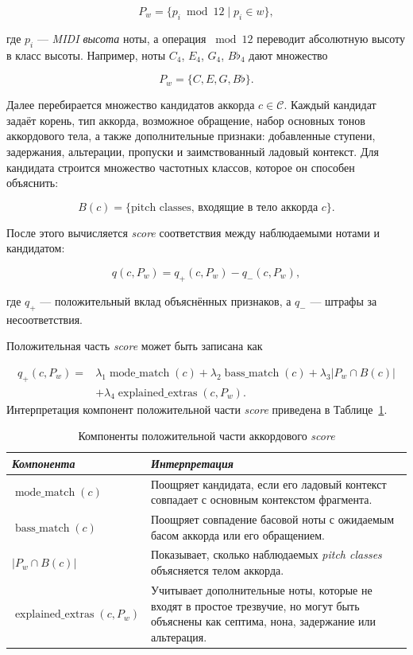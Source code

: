 \documentclass[a4paper,12pt]{extarticle}
\begin{document}
\[
P_w = \{p_i \bmod 12 \mid p_i \in w\},
\]

где $p_i$ --- \textit{MIDI высота} ноты, а операция $\bmod 12$ переводит абсолютную высоту в класс высоты. Например, ноты $C_4$, $E_4$, $G_4$, $B\flat_4$ дают множество

\[
P_w = \{C, E, G, B\flat\}.
\]

Далее перебирается множество кандидатов аккорда $c \in \mathcal{C}$. Каждый кандидат задаёт корень, тип аккорда, возможное обращение, набор основных тонов аккордового тела, а также дополнительные признаки: добавленные ступени, задержания, альтерации, пропуски и заимствованный ладовый контекст. Для кандидата строится множество частотных классов, которое он способен объяснить:

\[
B(c) = \{\text{pitch classes, входящие в тело аккорда } c\}.
\]

После этого вычисляется \textit{score} соответствия между наблюдаемыми нотами и кандидатом:

\[
q(c, P_w)
=
q_{+}(c, P_w)
-
q_{-}(c, P_w),
\]

где $q_{+}$ --- положительный вклад объяснённых признаков, а $q_{-}$ --- штрафы за несоответствия.

Положительная часть \textit{score} может быть записана как

\[
\begin{aligned}
q_{+}(c, P_w)
={}&
\lambda_1 \operatorname{mode\_match}(c)
+
\lambda_2 \operatorname{bass\_match}(c)
+
\lambda_3 |P_w \cap B(c)| \\
&+
\lambda_4 \operatorname{explained\_extras}(c, P_w).
\end{aligned}
\]
\newpage
Интерпретация компонент положительной части \textit{score} приведена в Таблице~\ref{tab:positive-score-components}.

\begin{table}[htbp]
\caption{Компоненты положительной части аккордового \textit{score}}
\label{tab:positive-score-components}
\centering
\footnotesize
\begin{tabular}{@{}p{}p{}@{}}
\toprule
\textit{Компонента} & \textit{Интерпретация} \\
\midrule
$\operatorname{mode\_match}(c)$ & Поощряет кандидата, если его ладовый контекст совпадает с основным контекстом фрагмента. \\
$\operatorname{bass\_match}(c)$ & Поощряет совпадение басовой ноты с ожидаемым басом аккорда или его обращением. \\
$|P_w \cap B(c)|$ & Показывает, сколько наблюдаемых \textit{pitch classes} объясняется телом аккорда. \\
$\operatorname{explained\_extras}(c, P_w)$ & Учитывает дополнительные ноты, которые не входят в простое трезвучие, но могут быть объяснены как септима, нона, задержание или альтерация. \\
\bottomrule
\end{tabular}
\end{table}
\end{document}
